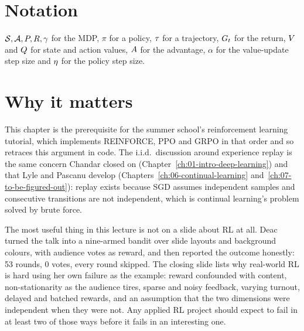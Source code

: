\section*{Notation}

$\mathcal{S}, \mathcal{A}, P, R, \gamma$ for the MDP, $\pi$ for a policy, $\tau$ for a
trajectory, $G_t$ for the return, $V$ and $Q$ for state and action values, $A$ for
the advantage, $\alpha$ for the value-update step size and $\eta$ for the policy step size.

\section*{Why it matters}

This chapter is the prerequisite for the summer school's
reinforcement learning tutorial, which implements REINFORCE, PPO and GRPO in that order and so
retraces this argument in code. The i.i.d.\ discussion around experience
replay is the same concern Chandar closed on
(Chapter~\ref{ch:01-intro-deep-learning}) and that Lyle and Pascanu develop
(Chapters~\ref{ch:06-continual-learning} and~\ref{ch:07-to-be-figured-out}): replay exists
because SGD assumes independent samples and consecutive transitions are not independent,
which is continual learning's problem solved by brute force.

\begin{aside}
The most useful thing in this lecture is not on a slide about RL at all. Deac turned the
talk into a nine-armed bandit over slide layouts and background colours, with audience votes
as reward, and then reported the outcome honestly: 53 rounds, 0 votes, every round skipped.
The closing slide lists why real-world RL is hard using her own failure as the example:
reward confounded with content, non-stationarity as the audience tires, sparse and noisy
feedback, varying turnout, delayed and batched rewards, and an assumption that the two
dimensions were independent when they were not. Any applied RL project should expect to fail
in at least two of those ways before it fails in an interesting one.
\end{aside}
